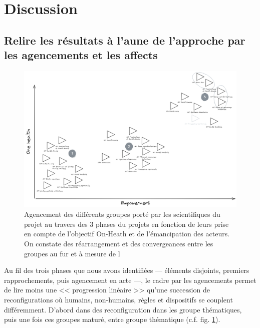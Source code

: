 \documentclass{article}
\begin{document}

\section{Discussion}

\subsection{Relire les résultats à l’aune de l’approche par les agencements et les affects}

\begin{figure}
    \centering
    \includegraphics[width=1\linewidth]{img/Drawing 2025-09-07 11.03.30.excalidraw.png}
    \caption{Agencement des différents groupes porté par les scientifiques du projet au travers des 3 phases du projets en fonction de leurs prise en compte de l’objectif On-Heath et de l’émancipation des acteurs. On constate des réarrangement et des convergeances entre les groupes au fur et à mesure de l}
    \label{fig:alignement-proj}
\end{figure}

Au fil des trois phases que nous avons identifiées — éléments disjoints, premiers rapprochements, puis agencement en acte —, le cadre par les agencements permet de lire moins une << progression linéaire >> qu’une succession de reconfigurations où humains, non-humains, règles et dispositifs se couplent différemment. D'abord dans des reconfiguration dans les groupe thématiques, puis une fois ces groupes maturé, entre groupe thématique (c.f. fig. \ref{fig:alignement-proj}).
\end{document}
